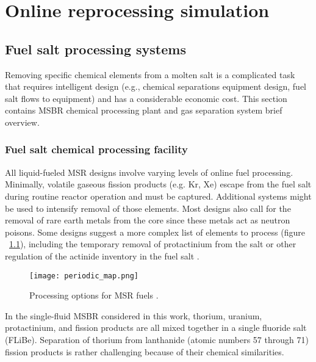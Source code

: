 \chapter[Online reprocessing simulation]{Online reprocessing simulation}

\section{Fuel salt processing systems}
Removing specific chemical elements from a molten salt is a complicated task that requires intelligent design (e.g., chemical separations equipment design, fuel salt flows to equipment) and has a considerable economic cost. This section contains \gls{MSBR} chemical processing plant and gas separation system brief overview.

\subsection{Fuel salt chemical processing facility}
All liquid-fueled \gls{MSR} designs involve varying levels of online fuel processing. Minimally, volatile gaseous fission products (e.g. Kr, Xe) escape from the fuel salt during routine reactor operation and must be captured. Additional systems might be used to intensify removal of those elements. Most designs also call for the removal of rare earth metals from the core since these metals act as neutron poisons. Some designs suggest a more complex list of elements to process (figure ~\ref{fig:periodic_tab}), including the temporary removal of protactinium from the salt or other regulation of the actinide inventory in the fuel salt \cite{ahmad_neutronics_2015}.

\begin{figure}[htp!] %
  \centering
  \vspace{-0.3em}
  \texttt{[image: periodic\_map.png]}
  \caption{Processing options for \gls{MSR} fuels \cite{ahmad_neutronics_2015}.}
  \vspace{-0.6em}
  \label{fig:periodic_tab}
\end{figure}
\FloatBarrier

In the single-fluid \gls{MSBR} considered in this work, thorium, uranium, protactinium, and fission products are all mixed together in a single fluoride salt (FLiBe). Separation of thorium from lanthanide (atomic numbers 57 through 71) fission products is rather challenging because of their chemical similarities. 

